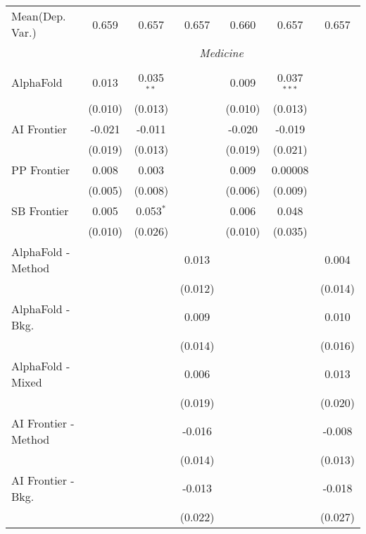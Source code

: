 \begin{tabular}{lcccccc}
Mean(Dep. Var.) & 0.659 & 0.657 & 0.657 & 0.660 & 0.657 & 0.657 \\
 & \multicolumn{6}{c}{\textit{Medicine}} \\ \\
   AlphaFold            & 0.013   & 0.035$^{**}$ &         & 0.009   & 0.037$^{***}$ &   \\   
                        & (0.010) & (0.013)      &         & (0.010) & (0.013)       &   \\   
   AI Frontier          & -0.021  & -0.011       &         & -0.020  & -0.019        &   \\   
                        & (0.019) & (0.013)      &         & (0.019) & (0.021)       &   \\   
   PP Frontier          & 0.008   & 0.003        &         & 0.009   & 0.00008       &   \\   
                        & (0.005) & (0.008)      &         & (0.006) & (0.009)       &   \\   
   SB Frontier          & 0.005   & 0.053$^{*}$  &         & 0.006   & 0.048         &   \\   
                        & (0.010) & (0.026)      &         & (0.010) & (0.035)       &   \\   
   AlphaFold - Method   &         &              & 0.013   &         &               & 0.004\\   
                        &         &              & (0.012) &         &               & (0.014)\\   
   AlphaFold - Bkg.     &         &              & 0.009   &         &               & 0.010\\   
                        &         &              & (0.014) &         &               & (0.016)\\   
   AlphaFold - Mixed    &         &              & 0.006   &         &               & 0.013\\   
                        &         &              & (0.019) &         &               & (0.020)\\   
   AI Frontier - Method &         &              & -0.016  &         &               & -0.008\\   
                        &         &              & (0.014) &         &               & (0.013)\\   
   AI Frontier - Bkg.   &         &              & -0.013  &         &               & -0.018\\   
                        &         &              & (0.022) &         &               & (0.027)\\   

\end{tabular}
